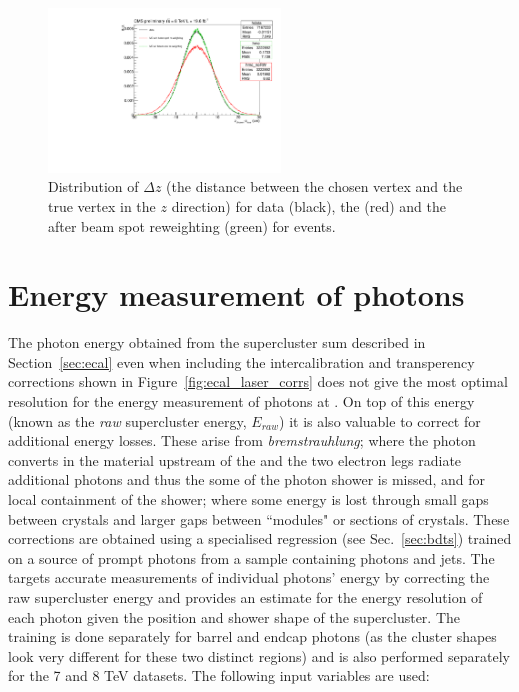 \begin{figure}
  \begin{center}
  \includegraphics[width=0.55\textwidth]{ch3_comm_anal_comps/plots/beamspot.pdf}
  \caption{Distribution of $\Delta z$ (the distance between the chosen vertex and the true vertex in the $z$ direction) for data (black), the \MC (red) and the \MC after beam spot reweighting (green) for \Zmumu events.}
  \label{fig:beamspot}
  \end{center}
\end{figure}

\section{Energy measurement of photons}
\label{sec:photon_energy}

The photon energy obtained from the supercluster sum described in Section~\ref{sec:ecal} even when including the intercalibration and transperency corrections shown in Figure~\ref{fig:ecal_laser_corrs} does not give the most optimal resolution for the energy measurement of photons at \CMS. On top of this energy (known as the \emph{raw} supercluster energy, $E_{raw}$) it is also valuable to correct for additional energy losses. These arise from \emph{bremstrauhlung}; where the photon converts in the material upstream of the \ECAL and the two electron legs radiate additional photons and thus the some of the photon shower is missed, and for local containment of the shower; where some energy is lost through small gaps between \ECAL crystals and larger gaps between ``modules" or sections of crystals. These corrections are obtained using a specialised regression \BDT (see Sec.~\ref{sec:bdts}) trained on a \MC source of prompt photons from a sample containing photons and jets. The \BDT targets accurate measurements of individual photons' energy by correcting the raw supercluster energy and provides an estimate for the energy resolution of each photon given the position and shower shape of the supercluster. The training is done separately for barrel and endcap photons (as the cluster shapes look very different for these two distinct regions) and is also performed separately for the 7 and 8 TeV datasets. The following input variables are used:

